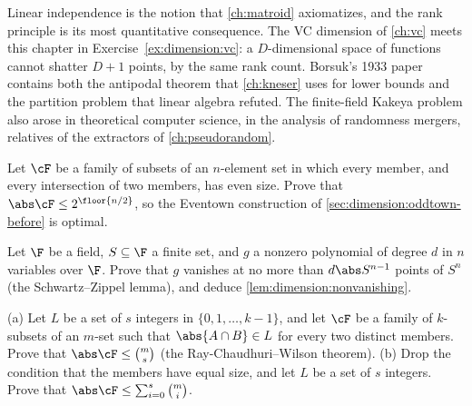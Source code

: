 \begin{refsection}
Linear independence is the notion that \cref{ch:matroid} axiomatizes, and the rank principle is its most quantitative consequence. The VC dimension of \cref{ch:vc} meets this chapter in Exercise~\ref{ex:dimension:vc}: a $D$-dimensional space of functions cannot shatter $D+1$ points, by the same rank count. Borsuk's 1933 paper contains both the antipodal theorem that \cref{ch:kneser} uses for lower bounds and the partition problem that linear algebra refuted. The finite-field Kakeya problem also arose in theoretical computer science, in the analysis of randomness mergers, relatives of the extractors of \cref{ch:pseudorandom}.

\begin{exercises}
\item \consolidation\hard Let $\cF$ be a family of subsets of an $n$-element set in which every member, and every intersection of two members, has even size. Prove that $\abs\cF\le2^{\floor{n/2}}$, so the Eventown construction of \cref{sec:dimension:oddtown-before} is optimal. \label{ex:dimension:eventown}

\item \consolidation Let $\F$ be a field, $S\subseteq\F$ a finite set, and $g$ a nonzero polynomial of degree $d$ in $n$ variables over $\F$. Prove that $g$ vanishes at no more than $d\abs S^{n-1}$ points of $S^n$ (the Schwartz--Zippel lemma), and deduce \cref{lem:dimension:nonvanishing}.\label{ex:dimension:sz}

\item \consolidation\hard (a) Let $L$ be a set of $s$ integers in $\{0,1,\dots,k-1\}$, and let $\cF$ be a family of $k$-subsets of an $m$-set such that $\abs{A\cap B}\in L$ for every two distinct members. Prove that $\abs\cF\le\binom ms$ (the Ray-Chaudhuri--Wilson theorem). (b) Drop the condition that the members have equal size, and let $L$ be a set of $s$ integers. Prove that $\abs\cF\le\sum_{i=0}^s\binom mi$. \label{ex:dimension:rw}


\end{exercises}
\end{refsection}
